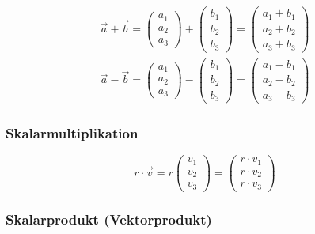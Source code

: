 \documentclass[a4paper,11pt]{article}
\begin{document}
	\begin{eqnarray}
		\overrightarrow{a} + \overrightarrow{b}
		= \left( \begin{array}{c} a_1\\a_2\\a_3\end{array}\right) + \left( \begin{array}{c} b_1\\b_2\\b_3\end{array}\right)
		= \left( \begin{array}{c} a_1 + b_1\\a_2 + b_2\\a_3 + b_3\end{array}\right) \\
		\overrightarrow{a} - \overrightarrow{b}
		= \left( \begin{array}{c} a_1\\a_2\\a_3\end{array}\right) - \left( \begin{array}{c} b_1\\b_2\\b_3\end{array}\right)
		= \left( \begin{array}{c} a_1 - b_1\\a_2 - b_2\\a_3 - b_3\end{array}\right)
	\end{eqnarray}
	
	\subsubsection{Skalarmultiplikation}
	\label{ssub:skalarmultiplikation}
	
	\begin{equation}
		r \cdot \overrightarrow{v} = r \left( \begin{array}{c} v_1\\v_2\\v_3\end{array}\right)
		= \left( \begin{array}{c}r \cdot v_1\\r \cdot v_2\\r \cdot v_3\end{array}\right)
	\end{equation}

	\subsubsection{Skalarprodukt (Vektorprodukt)} %
	\label{ssub:skalarprodukt_vektorprodukt_}
	
\end{document}
